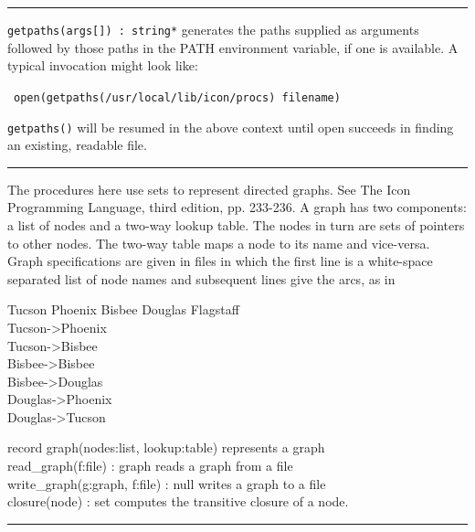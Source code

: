 \vspace{0.25cm}\hrule{}

\texttt{getpaths(args[]) : string*} generates the paths supplied as
arguments followed by those paths in the PATH environment variable, if one is available. A typical
invocation might look like:

\ \texttt{open(getpaths({\textquotedbl}/usr/local/lib/icon/procs{\textquotedbl})
{\textbar}{\textbar} filename)}

\texttt{getpaths()} will be resumed in the above context until open
succeeds in finding an existing, readable file.

\vspace{0.25cm}\hrule{}

The procedures here use sets to represent directed graphs.
See {\textquotedbl}The Icon Programming Language{\textquotedbl}, third
edition, pp. 233-236. A graph has two components: a list of nodes and a
two-way lookup table. The nodes in turn are sets of
pointers to other nodes. The two-way table maps a node
to its name and vice-versa. Graph specifications are given in files in
which the first line is a white-space separated list of node names and
subsequent lines give the arcs, as in

Tucson Phoenix Bisbee Douglas Flagstaff\\
Tucson-{\textgreater}Phoenix\\
Tucson-{\textgreater}Bisbee\\
Bisbee-{\textgreater}Bisbee\\
Bisbee-{\textgreater}Douglas\\
Douglas-{\textgreater}Phoenix\\
Douglas-{\textgreater}Tucson

record graph(nodes:list, lookup:table) represents a graph\\
read\_graph(f:file) : graph reads a graph from a file\\
write\_graph(g:graph, f:file) : null writes a graph to a file\\
closure(node) : set computes the transitive closure of a node.
\ \ \ \ \ \ 

\vspace{0.25cm}\hrule{}

